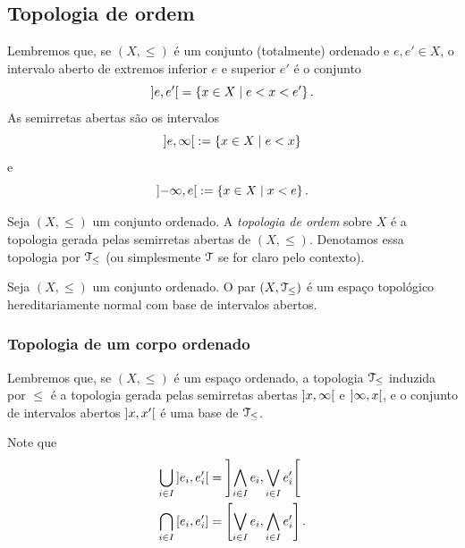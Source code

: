 \subsection{Topologia de ordem}

Lembremos que, se $(X,\leq)$ é um conjunto (totalmente) ordenado e $e,e' \in X$, o intervalo aberto de extremos inferior $e$ e superior $e'$ é o conjunto
	\begin{equation*}
	\left]{e},{e'}\right[= \left\{{x \in X}\;\middle\vert\;{e < x < e'}\right\}.
	\end{equation*}
As semirretas abertas são os intervalos
	\begin{equation*}
	\left]{e},{\infty}\right[ := \left\{{x \in X}\;\middle\vert\;{e < x}\right\}
	\end{equation*}
e
	\begin{equation*}
	\left]{-\infty},{e}\right[ := \left\{{x \in X}\;\middle\vert\;{x < e}\right\}.
	\end{equation*}


\begin{definition}
Seja $(X,\leq)$ um conjunto ordenado. A \emph{topologia de ordem} sobre $X$ é a topologia gerada pelas semirretas abertas de $(X,\leq)$. %
Denotamos essa topologia por $\mathcal{T}_\leq$ (ou simplesmente $\mathcal{T}$ se for claro pelo contexto).
\end{definition}

\begin{proposition}
Seja $(X,\leq)$ um conjunto ordenado. O par $(X,\mathcal{T}_\leq)$ é um espaço topológico hereditariamente normal com base de intervalos abertos.
\end{proposition}

\subsubsection{Topologia de um corpo ordenado}

Lembremos que, se $(X,\leq)$ é um espaço ordenado, a topologia $\mathcal{T}_\leq$ induzida por $\leq$ é a topologia gerada pelas semirretas abertas $\left]{x},{\infty}\right[$ e $\left]{\infty},{x}\right[$, e o conjunto de intervalos abertos $\left]{x},{x'}\right[$ é uma base de $\mathcal{T}_\leq$.

Note que
	\begin{align*}
	\bigcup_{i \in I} \left]{e_i},{e'_i}\right[ &= \left]{\bigwedge_{i \in I} e_i},{\bigvee_{i \in I} e'_i}\right[ \\
	\bigcap_{i \in I} \left[{e_i},{e'_i}\right] &= \left[{\bigvee_{i \in I} e_i},{\bigwedge_{i \in I} e'_i}\right].
	\end{align*}

